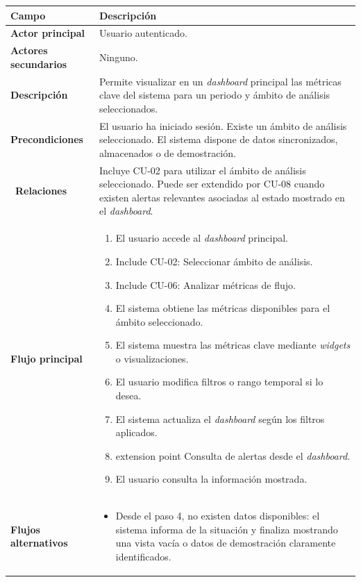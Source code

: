 {\renewcommand{\arraystretch}{1.25}\footnotesize
\begin{longtable}{p{3.2cm}p{10.2cm}}
\toprule
\textbf{Campo} & \textbf{Descripción} \\
\midrule
\textbf{Actor principal} & Usuario autenticado. \\
\textbf{Actores secundarios} & Ninguno. \\
\textbf{Descripción} & Permite visualizar en un \textit{dashboard} principal las métricas clave del sistema para un periodo y ámbito de análisis seleccionados. \\
\textbf{Precondiciones} & El usuario ha iniciado sesión. Existe un ámbito de análisis seleccionado. El sistema dispone de datos sincronizados, almacenados o de demostración. \\\
\textbf{Relaciones} & Incluye CU-02 para utilizar el ámbito de análisis seleccionado. Puede ser extendido por CU-08 cuando existen alertas relevantes asociadas al estado mostrado en el \textit{dashboard}. \\
\textbf{Flujo principal} & \begin{minipage}[t]{10.2cm}\begin{enumerate}[noitemsep,leftmargin=*]
    \item El usuario accede al \textit{dashboard} principal.
    \item Include CU-02: Seleccionar ámbito de análisis.
    \item Include CU-06: Analizar métricas de flujo.
    \item El sistema obtiene las métricas disponibles para el ámbito seleccionado.
    \item El sistema muestra las métricas clave mediante \textit{widgets} o visualizaciones.
    \item El usuario modifica filtros o rango temporal si lo desea.
    \item El sistema actualiza el \textit{dashboard} según los filtros aplicados.
    \item[] extension point Consulta de alertas desde el \textit{dashboard}.
    \item El usuario consulta la información mostrada.
\end{enumerate}\end{minipage} \\
\textbf{Flujos alternativos} & \begin{minipage}[t]{10.2cm}\begin{itemize}[noitemsep,leftmargin=*]
    \item Desde el paso 4, no existen datos disponibles: el sistema informa de la situación y finaliza mostrando una vista vacía o datos de demostración claramente identificados.

\end{itemize}
\end{minipage}
\end{longtable}}

